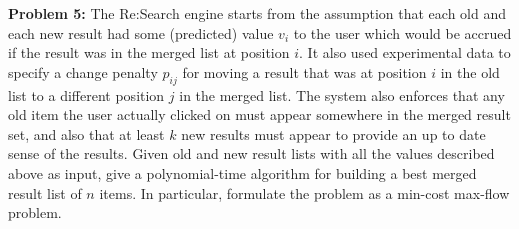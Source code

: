 \documentclass[psamsfonts]{amsart}
\newenvironment{prob}[1]{\begin{framed}{\large \bfseries Problem #1:}}{\end{framed}}
\begin{document}
\begin{prob}{5}
The Re:Search engine starts from the assumption that each old and each new result had some (predicted) value $v_i$ to the user which would be accrued if the result was in the merged list at position $i$. It also used experimental data to specify a change penalty $p_{ij}$ for moving a result that was at position $i$ in the old list to a different position $j$ in the merged list. The system also enforces that any old item the user actually clicked on must appear somewhere in the merged result set, and also that at least $k$ new results must appear to provide an up to date sense of the results. Given old and new result lists with all the values described above as input, give a polynomial-time algorithm for building a best merged result list of $n$ items. In particular, formulate the problem as a min-cost max-flow problem.
\end{prob}
\end{document}
